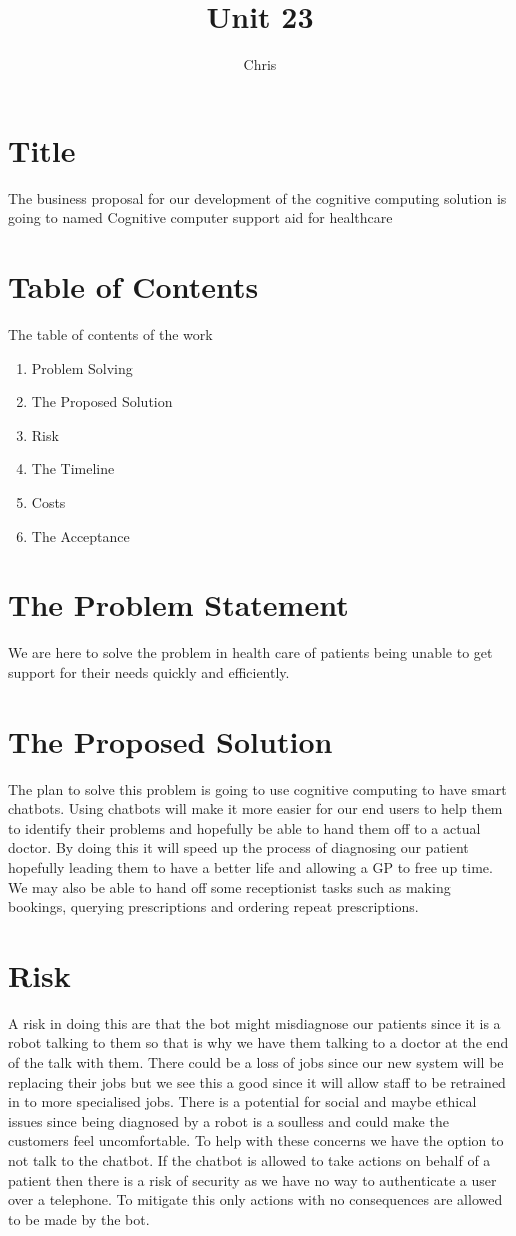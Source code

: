\documentclass{article}
\title{Unit 23}
\author{Chris}
\date{}
\begin{document}
\section{Title}
The business proposal for our development of the cognitive computing solution is going to named 
Cognitive computer support aid for healthcare

\section{Table of Contents}
The table of contents of the work
\begin{enumerate}
	\item	Problem Solving
	\item	The Proposed Solution
	\item 	Risk
	\item The Timeline
	\item Costs
	\item The Acceptance
\end{enumerate}

\section{The Problem Statement}
We are here to solve the problem in health care of patients being unable to get support for their needs quickly and efficiently.

\section{The Proposed Solution}
The plan to solve this problem is going to use cognitive computing to have smart chatbots. Using chatbots will make it more easier for our end users to help them to identify their problems and hopefully be able to hand them off to a actual doctor. By doing this it will speed up the process of diagnosing our patient hopefully leading them to have a better life and allowing a GP to free up time. We may also be able to hand off some receptionist tasks such as making bookings, querying prescriptions and ordering repeat prescriptions.

\section{Risk}
A risk in doing this are that the bot might misdiagnose our patients since it is a robot talking to them so that is why we have them talking to a doctor at the end of the talk with them. There could be a loss of jobs since our new system will be replacing their jobs but we see this a good since it will allow staff to be retrained in to more specialised jobs. 
There is a potential for social and maybe ethical issues since being diagnosed by a robot is a soulless and could make the customers feel uncomfortable. To help with these concerns we have the option to not talk to the chatbot.
If the chatbot is allowed to take actions on behalf of a patient then there is a risk of security as we have no way to authenticate a user over a telephone. To mitigate this only actions with no consequences are allowed to be made by the bot.
\end{document}
